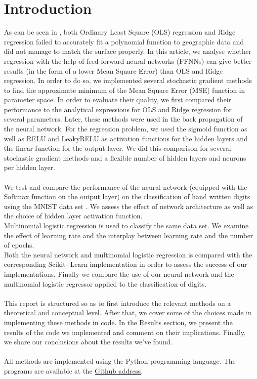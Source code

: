 \documentclass[11pt,a4paper,titlepage]{article}
\begin{document}
\section{Introduction}
As can be seen in \citep{Project1}, both Ordinary Least Square (OLS) regression and  Ridge regression failed to accurately fit a polynomial function to geographic data and did not manage to match the surface properly. In this article, we analyse whether regression with the help of feed forward neural networks (FFNNs) can give better results (in the form of a lower Mean Square Error) than OLS and Ridge regression. In order to do so, we implemented several stochastic gradient methods to find the approximate minimum of the Mean Square Error (MSE) function in parameter space. In order to evaluate their quality, we first compared their performance to the analytical expressions for OLS and Ridge regression for several parameters. Later, these methods were used in the back propagation of the neural network. For the regression problem, we used the sigmoid function as well as RELU and LeakyRELU as activation functions for the hidden layers and the linear function for the output layer. We did this comparison for several stochastic gradient methods and a flexible number of hidden layers and neurons per hidden layer. \\\\We test and compare the performance of the neural network (equipped with the Softmax function on the output layer) on the classification of hand written digits using the MNIST data set \citep{lecun2010mnist}. We assess the effect of network architecture as well as the choice of hidden layer activation function.\\ Multinomial logistic regression is used to classify the same data set. We examine the effect of learning rate and the interplay between learning rate and the number of epochs.\\Both the neural network and multinomial logistic regression is compared with the corresponding Scikit- Learn implementation in order to assess the success of our implementations. Finally we compare the use of our neural network and the multinomial logistic regressor applied to the classification of digits.\\\\This report is structured so as to first introduce the relevant methods on a theoretical and conceptual level. After that, we cover some of the choices made in implementing these methods in code. In the Results section, we present the results of the code we implemented and comment on their implications. Finally, we share our conclusions about the results we've found.\\\\All methods are implemented using the Python programming language. The programs are available at the \href{https://github.com/schraderSimon/FYS-STK/tree/master/project2}{Github address}.
\end{document}

